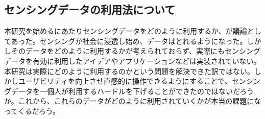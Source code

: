 \subsection{センシングデータの利用法について}
本研究を始めるにあたりセンシングデータをどのように利用するか、が議論としてあった。センシングが社会に浸透し始め、データはとれるようになった。しかしそのデータをどのように利用するかが考えられておらず、実際にもセンシングデータを有効に利用したアイデアやアプリケーションなどは実装されていない。本研究は実際にどのように利用するのかという問題を解決できた訳ではない。しかしユーザビリティを向上させ直感的に操作できるようにすることで、センシングデータを一個人が利用するハードルを下げることができたのではないだろうか。これから、これらのデータがどのように利用されていくかが本当の課題になってくるだろう。


